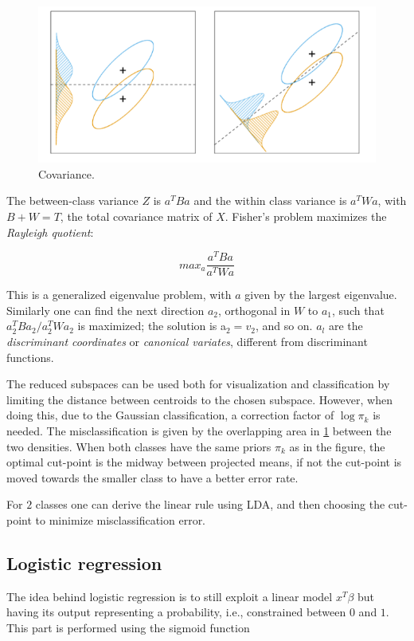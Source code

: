 \documentclass[12pt, letterpaper]{article}
\theoremstyle{definition}
\begin{document}
\begin{figure}
\centering
\includegraphics[scale=0.4]{img/cov}
\caption{Covariance.}
\label{cov}
\end{figure}

The between-class variance $Z$ is $a^TBa$ and the within class variance is $a^TWa$, with $B+W=T$, the total covariance matrix of $X$.
Fisher's problem maximizes the \textit{Rayleigh quotient}:

\begin{equation}
max_{a} \frac{a^TBa}{a^TWa}
\end{equation}

This is a generalized eigenvalue problem, with $a$ given by the largest eigenvalue. Similarly one can find the next direction $a_2$, orthogonal in $W$ to $a_1$, such that $a^T_2 Ba_2/a^T_2 Wa_2$ is maximized; the solution is a$_2 = v_2$, and so on. $a_l$ are the \textit{discriminant coordinates} or \textit{canonical variates}, different from discriminant functions.

The reduced subspaces can be used both for visualization and classification by limiting the distance between centroids to the chosen subspace. However, when doing this, due to the Gaussian classification, a correction factor of $\log \pi_k$ is needed. The misclassification is given by the overlapping area in \ref{cov} between the two densities. When both classes have the same priors $\pi_k$ as in the figure, the optimal cut-point is the midway between projected means, if not the cut-point is moved towards the smaller class to have a better error rate.

For $2$ classes one can derive the linear rule using LDA, and then choosing the cut-point to minimize misclassification error.

\subsection{Logistic regression}
The idea behind logistic regression is to still exploit a linear model $x^T\beta$ but having its output representing a probability, i.e., constrained between $0$ and $1$. This part is performed using the sigmoid function
\end{document}
